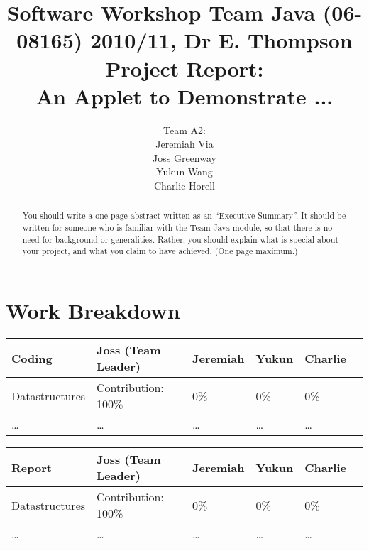 \documentclass[10pt]{report}
\title{%
  {\normalsize Software Workshop Team Java (06-08165) 2010/11, Dr E. Thompson }\\[2cm]
  Project Report:\\
  An Applet to Demonstrate ...}
\author{Team A2:  \\
  Jeremiah Via \\
  Joss Greenway \\
  Yukun Wang \\
  Charlie Horell
}
\begin{document}
\maketitle
\chapter*{Work Breakdown}
\label{work-breakdown}

\thispagestyle{empty}


{\small
  \noindent\begin{tabular}{|l||l|l|l|l|l|}\hline
    \textbf{Coding} & \textbf{Joss (Team Leader)} & \textbf{Jeremiah} & \textbf{Yukun} & \textbf{Charlie} \\ \hline\hline
    Datastructures  & Contribution: 100\%         & 0\%               & 0\%            & 0\%              \\ \hline
    \ldots          & \ldots                      & \ldots            & \ldots          & \ldots           \\ \hline
  \end{tabular}\vspace*{1cm}

  \noindent\begin{tabular}{|l||l|l|l|l|l|}\hline
    \textbf{Report} & \textbf{Joss (Team Leader)} & \textbf{Jeremiah} & \textbf{Yukun} & \textbf{Charlie} \\ \hline\hline
    Datastructures  & Contribution: 100\%         & 0\%               & 0\%            & 0\%              \\ \hline
    \ldots          & \ldots                      & \ldots            & \ldots          & \ldots           \\ \hline
  \end{tabular}
}

\tableofcontents
\thispagestyle{empty}

\begin{abstract}
  You should write a one-page abstract written as an ``Executive Summary''. It
  should be written for someone who is familiar with the Team Java module, so
  that there is no need for background or generalities. Rather, you should
  explain what is special about your project, and what you claim to have
  achieved. (One page maximum.)
\end{abstract}







\end{document}
